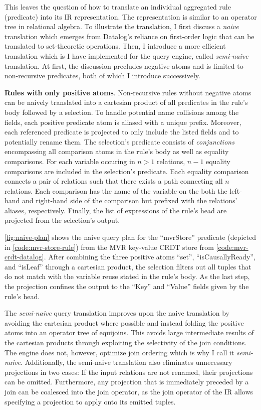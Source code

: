 This leaves the question of how to translate an individual aggregated rule
(predicate) into its \ac{IR} representation.
The representation is similar to an operator tree in relational algebra.
To illustrate the translation, I first discuss a \emph{naive} translation
which emerges from Datalog's reliance on first-order logic that can be
translated to set-theoretic operations.
Then, I introduce a more efficient translation which is I have implemented
for the query engine, called \emph{semi-naive} translation.
At first, the discussion precludes negative atoms and is limited to
non-recursive predicates, both of which I introduce successively.

\textbf{Rules with only positive atoms}.
Non-recursive rules without negative atoms can be naively translated
into a cartesian product of all predicates in the rule's body followed by
a selection.
To handle potential name collisions among the fields,
each positive predicate atom is aliased with a unique prefix.
Moreover, each referenced predicate is projected to only include the listed
fields and to potentially rename them.
The selection's predicate consists of \emph{conjunctions}
encompassing all comparison atoms in the rule's body as well as equality comparisons.
For each variable occuring in \(n > 1\) relations, \(n - 1\) equality comparisons
are included in the selection's predicate.
Each equality comparison connects a pair of relations such that there exists
a path connecting all \(n\) relations.
Each comparison has the name of the variable on the both the left-hand and right-hand
side of the comparison but prefixed with the relations' aliases, respectively.
Finally, the list of expressions of the rule's head are projected from the
selection's output.

\ref{fig:naive-plan} shows the naive query plan for the ``mvrStore'' predicate
(depicted in \ref{code:mvr-store-rule})
from the \ac{MVR} key-value \ac{CRDT} store from \ref{code:mvr-crdt-datalog}.
After combining the three positive atoms ``set'', ``isCausallyReady'', and
``isLeaf'' through a cartesian product, the selection filters out all tuples that
do not match with the variable reuse stated in the rule's body.
As the last step, the projection confines the output to the ``Key'' and ``Value''
fields given by the rule's head.

The \emph{semi-naive} query translation improves upon the naive translation
by avoiding the cartesian product where possible and instead folding the positive
atoms into an operator tree of equijoins.
This avoids large intermediate results of the cartesian products through
exploiting the selectivity of the join conditions.
The engine does not, however, optimize join ordering which is why I call it
\emph{semi-naive}.
Additionally, the semi-naive translation also eliminates unnecessary projections
in two cases:
If the input relations are not renamed, their projections can be omitted.
Furthermore, any projection that is immediately preceded by a join can be
coalesced into the join operator, as the join operator of the \ac{IR}
allows specifying a projection to apply onto its emitted tuples.

